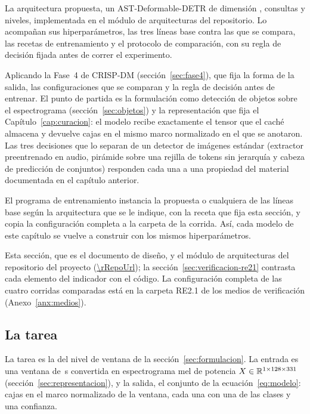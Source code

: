  La arquitectura propuesta, un AST-Deformable-DETR de
dimensión \mDim{}, \mQueries{} consultas y \mLevels{} niveles, implementada en el
módulo de arquitecturas del repositorio. Lo acompañan sus hiperparámetros, las
tres líneas base contra las que se compara, las recetas de entrenamiento y el
protocolo de comparación, con su regla de decisión fijada antes de correr el
experimento.

 Aplicando la Fase~4 de CRISP-DM
(sección~\ref{sec:fase4}), que fija la forma de la salida, las configuraciones
que se comparan y la regla de decisión antes de entrenar. El punto de partida es
la formulación como detección de objetos sobre el espectrograma
(sección~\ref{sec:objetos}) y la representación que fija el
Capítulo~\ref{cap:curacion}: el modelo recibe exactamente el tensor que
el caché almacena y devuelve cajas en el mismo marco normalizado en el que se
anotaron. Las tres decisiones que lo separan de un detector de imágenes estándar
(extractor preentrenado en audio, pirámide sobre una rejilla de tokens sin
jerarquía y cabeza de predicción de conjuntos) responden cada una a una
propiedad del material documentada en el capítulo anterior.

 El programa de entrenamiento instancia la propuesta o
cualquiera de las líneas base según la arquitectura que se le indique, con la
receta que fija esta sección, y copia la configuración completa a la carpeta de la
corrida. Así, cada modelo de este capítulo se vuelve a
construir con los mismos hiperparámetros.

 Esta sección, que es el documento de diseño, y el
módulo de arquitecturas  del repositorio del proyecto
(\url{\rRepoUrl}); la
sección~\ref{sec:verificacion-re21} contrasta cada elemento del indicador con el
código. La configuración completa de las cuatro corridas comparadas está en la
carpeta RE2.1 de los medios de verificación (Anexo~\ref{anx:medios}).

\subsection{La tarea}

La tarea es la del nivel de ventana de la sección~\ref{sec:formulacion}. La
entrada es una ventana de \clipLen{}\,s convertida en espectrograma mel de
potencia $X \in \mathbb{R}^{1 \times 128 \times 331}$
(sección~\ref{sec:representacion}), y la salida, el conjunto de la
ecuación~\eqref{eq:modelo}: cajas en el marco normalizado de la ventana, cada una
con una de las \nClasses{} clases y una confianza.

